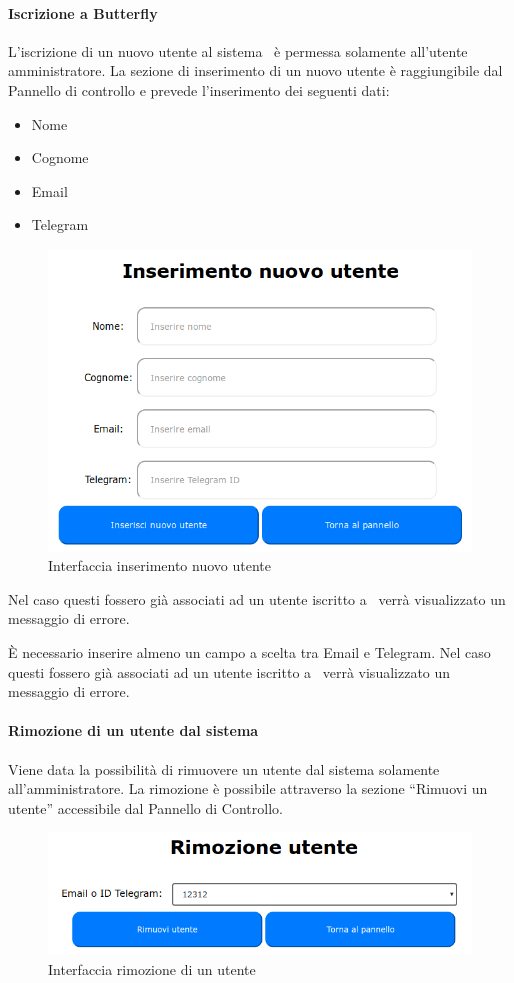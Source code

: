 \paragraph{Iscrizione a Butterfly}\label{Iscrizione}
L'iscrizione di un nuovo utente al sistema \progetto\ è permessa solamente all'utente amministratore.
La sezione di inserimento di un nuovo utente è raggiungibile dal Pannello di controllo e prevede l'inserimento dei seguenti dati:
\begin{itemize}
	\item Nome
	\item Cognome
	\item Email
	\item Telegram
\end{itemize}
\begin{figure}[H]
	\centering
	\includegraphics[width=13cm]{img/inserimento_1.png}
	\caption{Interfaccia inserimento nuovo utente}
\end{figure}
Nel caso questi fossero già associati ad un utente iscritto a \progetto\ verrà visualizzato un messaggio di errore.

È necessario inserire almeno un campo a scelta tra Email e Telegram.
Nel caso questi fossero già associati ad un utente iscritto a \progetto\ verrà visualizzato un messaggio di errore.

\paragraph{Rimozione di un utente dal sistema}\label{Rimozione}
Viene data la possibilità di rimuovere un utente dal sistema solamente all'amministratore.
La rimozione è possibile attraverso la sezione ``Rimuovi un utente'' accessibile dal Pannello di Controllo.
\begin{figure}[H]
	\centering
	\includegraphics[width=12cm]{img/rimozione_1.png}
	\caption{Interfaccia rimozione di un utente}
\end{figure}

